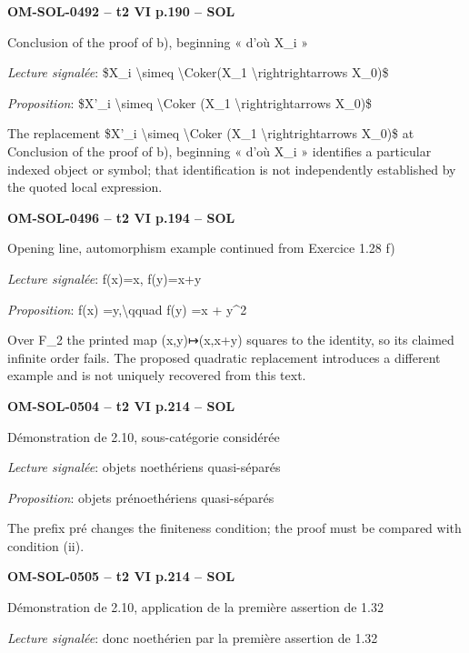 \par\noindent\textbf{OM-SOL-0492 -- t2 VI p.190 -- SOL}\par
Conclusion of the proof of b), beginning « d'où X\_i »\par
\emph{Lecture signalée}: \$X\_i \textbackslash{}simeq \textbackslash{}Coker(X\_1 \textbackslash{}rightrightarrows X\_0)\$\par
\emph{Proposition}: \$X'\_i \textbackslash{}simeq \textbackslash{}Coker (X\_1 \textbackslash{}rightrightarrows X\_0)\$\par
The replacement \$X'\_i \textbackslash{}simeq \textbackslash{}Coker (X\_1 \textbackslash{}rightrightarrows X\_0)\$ at Conclusion of the proof of b), beginning « d'où X\_i » identifies a particular indexed object or symbol; that identification is not independently established by the quoted local expression.\par
\par\noindent\textbf{OM-SOL-0496 -- t2 VI p.194 -- SOL}\par
Opening line, automorphism example continued from Exercice 1.28 f)\par
\emph{Lecture signalée}: f(x)=\allowbreak x, f(y)=\allowbreak x+y\par
\emph{Proposition}: f(x) =\allowbreak  y,\textbackslash{}qquad f(y) =\allowbreak  x + y\textasciicircum{}2\par
Over F\_2 the printed map (x,y)↦(x,x+y) squares to the identity, so its claimed infinite order fails. The proposed quadratic replacement introduces a different example and is not uniquely recovered from this text.\par
\par\noindent\textbf{OM-SOL-0504 -- t2 VI p.214 -- SOL}\par
Démonstration de 2.10, sous-catégorie considérée\par
\emph{Lecture signalée}: objets noethériens quasi-séparés\par
\emph{Proposition}: objets prénoethériens quasi-séparés\par
The prefix pré changes the finiteness condition; the proof must be compared with condition (ii).\par
\par\noindent\textbf{OM-SOL-0505 -- t2 VI p.214 -- SOL}\par
Démonstration de 2.10, application de la première assertion de 1.32\par
\emph{Lecture signalée}: donc noethérien par la première assertion de 1.32\par
